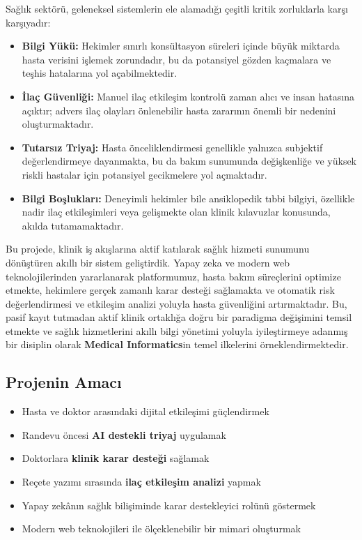 \documentclass[12pt,a4paper]{article}
\begin{document}
Sağlık sektörü, geleneksel sistemlerin ele alamadığı çeşitli kritik zorluklarla karşı karşıyadır:
\begin{itemize}
    \item \textbf{Bilgi Yükü:} Hekimler sınırlı konsültasyon süreleri içinde büyük miktarda hasta verisini işlemek zorundadır, bu da potansiyel gözden kaçmalara ve teşhis hatalarına yol açabilmektedir.
    \item \textbf{İlaç Güvenliği:} Manuel ilaç etkileşim kontrolü zaman alıcı ve insan hatasına açıktır; advers ilaç olayları önlenebilir hasta zararının önemli bir nedenini oluşturmaktadır.
    \item \textbf{Tutarsız Triyaj:} Hasta önceliklendirmesi genellikle yalnızca subjektif değerlendirmeye dayanmakta, bu da bakım sunumunda değişkenliğe ve yüksek riskli hastalar için potansiyel gecikmelere yol açmaktadır.
    \item \textbf{Bilgi Boşlukları:} Deneyimli hekimler bile ansiklopedik tıbbi bilgiyi, özellikle nadir ilaç etkileşimleri veya gelişmekte olan klinik kılavuzlar konusunda, akılda tutamamaktadır.
\end{itemize}

Bu projede, klinik iş akışlarına aktif katılarak sağlık hizmeti sunumunu dönüştüren akıllı bir sistem geliştirdik. Yapay zeka ve modern web teknolojilerinden yararlanarak platformumuz, hasta bakım süreçlerini optimize etmekte, hekimlere gerçek zamanlı karar desteği sağlamakta ve otomatik risk değerlendirmesi ve etkileşim analizi yoluyla hasta güvenliğini artırmaktadır. Bu, pasif kayıt tutmadan aktif klinik ortaklığa doğru bir paradigma değişimini temsil etmekte ve sağlık hizmetlerini akıllı bilgi yönetimi yoluyla iyileştirmeye adanmış bir disiplin olarak \textbf{Medical Informatics}in temel ilkelerini örneklendirmektedir.

\subsection{Projenin Amacı}
\begin{itemize}[leftmargin=2cm]
    \item Hasta ve doktor arasındaki dijital etkileşimi güçlendirmek
    \item Randevu öncesi \textbf{AI destekli triyaj} uygulamak
    \item Doktorlara \textbf{klinik karar desteği} sağlamak
    \item Reçete yazımı sırasında \textbf{ilaç etkileşim analizi} yapmak
    \item Yapay zekânın sağlık bilişiminde karar destekleyici rolünü göstermek
    \item Modern web teknolojileri ile ölçeklenebilir bir mimari oluşturmak
\end{itemize}
\end{document}
